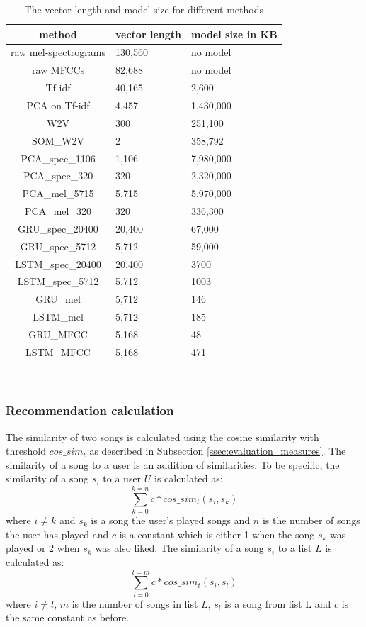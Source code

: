\begin{table}[h]
\centering
\renewcommand{\arraystretch}{1.5}
\begin{tabu} to 1\textwidth {| c || X[c] | X[c] | }
 \hline
 \textbf{method} & \textbf{vector length} & \textbf{model size in KB} \\
 \hline
 raw mel-spectrograms & 130,560 & no model \\
 \hline 
 raw MFCCs & 82,688 & no model \\
 \hline
 Tf-idf & 40,165 & 2,600 \\
 \hline
 PCA on Tf-idf & 4,457 & 1,430,000  \\
 \hline
 W2V & 300 & 251,100 \\
 \hline
 SOM\_W2V & 2 & 358,792 \\
 \hline
 PCA\_spec\_1106 & 1,106 & 7,980,000 \\
 \hline
 PCA\_spec\_320 & 320 & 2,320,000\\
 \hline
 PCA\_mel\_5715 & 5,715 & 5,970,000\\
 \hline
 PCA\_mel\_320 & 320 & 336,300 \\
 \hline
 GRU\_spec\_20400 & 20,400 & 67,000 \\
 \hline
 GRU\_spec\_5712 & 5,712 & 59,000 \\
 \hline
 LSTM\_spec\_20400 & 20,400 & 3700 \\
 \hline
 LSTM\_spec\_5712 & 5,712 & 1003 \\
 \hline
 GRU\_mel & 5,712 & 146 \\
 \hline
 LSTM\_mel & 5,712 & 185 \\
 \hline
 GRU\_MFCC & 5,168 & 48 \\
 \hline
 LSTM\_MFCC & 5,168 & 471 \\
 \hline
 \end{tabu} \\
\caption{The vector length and model size for different methods}
\label{table:time_space_complexities}
\end{table}

\subsubsection{Recommendation calculation}\label{ssec:recom_calcs}

The similarity of two songs is calculated using the cosine similarity with threshold $cos\_sim_t$ as described in Subsection
\ref{ssec:evaluation_measures}. The similarity of a song to a user is an addition of similarities. To be specific, the similarity of a song $s_i$ to a user $U$ is calculated as: $$ \sum_{k=0}^{k=n} c*cos\_sim_t(s_i, s_k) $$  where $ i \neq k $ and $ s_k $ is a song the user's played songs and $n$ is the number of songs the user has played and $c$ is a constant which is either 1 when the song $s_k$ was played or 2 when $s_k$ was also liked. 
The similarity of a song $s_i$ to a list $L$ is calculated as:
$$ \sum_{l=0}^{l=m} c*cos\_sim_t(s_i, s_l) $$ 
where $ i \neq l $, $m$ is the number of songs in list $L$, $s_l$ is a song from list L and $c$ is the same constant as before.

